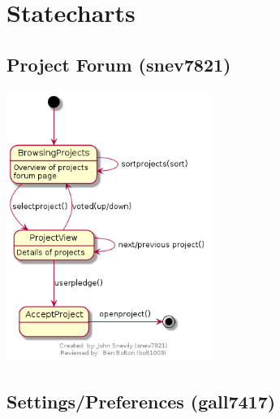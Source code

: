 \documentclass[11pt]{report}
\begin{document}
\chapter{Statecharts}

    \section{Project Forum (snev7821)}
        \begin{minipage}{1\textwidth}
            \begin{center}
                \includegraphics[width=0.5\textwidth]{diagrams/statechart-projectforum}
            \end{center}
        \end{minipage}
    
    \section{Settings/Preferences (gall7417)}
        \begin{minipage}{1\textwidth}
            \begin{center}
            \end{center}
        \end{minipage}
\end{document}
